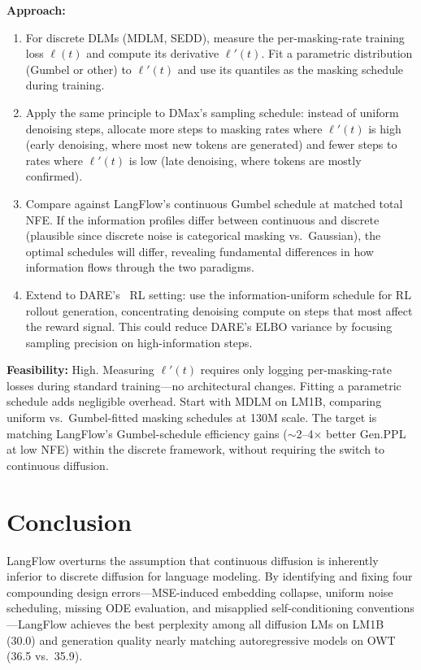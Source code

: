 \documentclass[11pt]{article}
\begin{document}
\textbf{Approach:}
\begin{enumerate}
    \item For discrete DLMs (MDLM, SEDD), measure the per-masking-rate training loss $\ell(t)$ and compute its derivative $\ell'(t)$. Fit a parametric distribution (Gumbel or other) to $\ell'(t)$ and use its quantiles as the masking schedule during training.

    \item Apply the same principle to DMax's sampling schedule: instead of uniform denoising steps, allocate more steps to masking rates where $\ell'(t)$ is high (early denoising, where most new tokens are generated) and fewer steps to rates where $\ell'(t)$ is low (late denoising, where tokens are mostly confirmed).

    \item Compare against LangFlow's continuous Gumbel schedule at matched total NFE. If the information profiles differ between continuous and discrete (plausible since discrete noise is categorical masking vs.\ Gaussian), the optimal schedules will differ, revealing fundamental differences in how information flows through the two paradigms.

    \item Extend to DARE's~\cite{dare} RL setting: use the information-uniform schedule for RL rollout generation, concentrating denoising compute on steps that most affect the reward signal. This could reduce DARE's ELBO variance by focusing sampling precision on high-information steps.
\end{enumerate}

\textbf{Feasibility:} High. Measuring $\ell'(t)$ requires only logging per-masking-rate losses during standard training---no architectural changes. Fitting a parametric schedule adds negligible overhead. Start with MDLM on LM1B, comparing uniform vs.\ Gumbel-fitted masking schedules at 130M scale. The target is matching LangFlow's Gumbel-schedule efficiency gains ($\sim$2--4$\times$ better Gen.PPL at low NFE) within the discrete framework, without requiring the switch to continuous diffusion.

\section{Conclusion}

LangFlow overturns the assumption that continuous diffusion is inherently inferior to discrete diffusion for language modeling. By identifying and fixing four compounding design errors---MSE-induced embedding collapse, uniform noise scheduling, missing ODE evaluation, and misapplied self-conditioning conventions---LangFlow achieves the best perplexity among all diffusion LMs on LM1B (30.0) and generation quality nearly matching autoregressive models on OWT (36.5 vs.\ 35.9).
\end{document}
